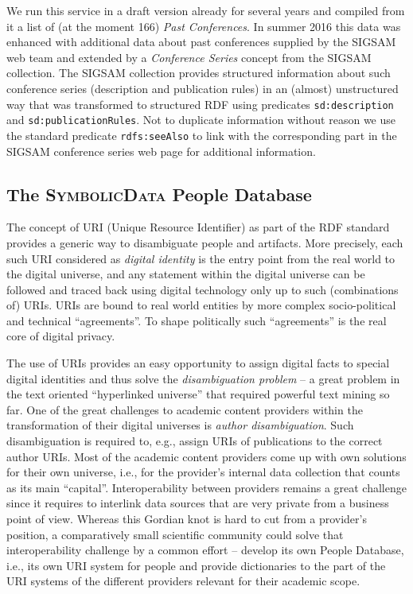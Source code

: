 \documentclass[a4paper,11pt]{article}
\def\SD{\textsc{SymbolicData}}
\begin{document}
We run this service in a draft version already for several years and compiled
from it a list of (at the moment 166) \emph{Past Conferences}. In summer 2016
this data was enhanced with additional data about past conferences supplied by
the SIGSAM web team and extended by a \emph{Conference Series} concept from the
SIGSAM collection.  The SIGSAM collection provides structured information about
such conference series (description and publication rules) in an (almost)
unstructured way that was transformed to structured RDF using predicates
\texttt{sd:description} and \texttt{sd:publicationRules}.  Not to duplicate
information without reason we use the standard predicate \texttt{rdfs:seeAlso}
to link with the corresponding part in the SIGSAM conference series web page
for additional information.

\subsection{The {\SD} People Database}

The concept of URI (Unique Resource Identifier) as part of the RDF standard
provides a generic way to disambiguate people and artifacts.  More precisely,
each such URI considered as \emph{digital identity} is the entry point from the
real world to the digital universe, and any statement within the digital
universe can be followed and traced back using digital technology only up to
such (combinations of) URIs. URIs are bound to real world entities by more
complex socio-political and technical ``agreements''. To shape politically such
``agreements'' is the real core of digital privacy.

The use of URIs provides an easy opportunity to assign digital facts to special
digital identities and thus solve the \emph{disambiguation problem} -- a great
problem in the text oriented ``hyperlinked universe'' that required powerful
text mining so far.  One of the great challenges to academic content providers
within the transformation of their digital universes is \emph{author
  disambiguation}. Such disambiguation is required to, e.g., assign URIs of
publications to the correct author URIs.  Most of the academic content
providers come up with own solutions for their own universe, i.e., for the
provider's internal data collection that counts as its main ``capital''.
Interoperability between providers remains a great challenge since it requires
to interlink data sources that are very private from a business point of view.
Whereas this Gordian knot is hard to cut from a provider's position, a
comparatively small scientific community could solve that interoperability
challenge by a common effort -- develop its own People Database, i.e., its own
URI system for people and provide dictionaries to the part of the URI systems
of the different providers relevant for their academic scope.
\end{document}
